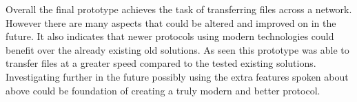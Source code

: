 Overall the final prototype achieves the task of transferring files across a network. However there are many aspects that could be altered and improved on in the future. It also indicates that newer protocols using modern technologies could benefit over the already existing old solutions. As seen this prototype was able to transfer files at a greater speed compared to the tested existing solutions. Investigating further in the future possibly using the extra features spoken about above could be foundation of creating a truly modern and better protocol.
